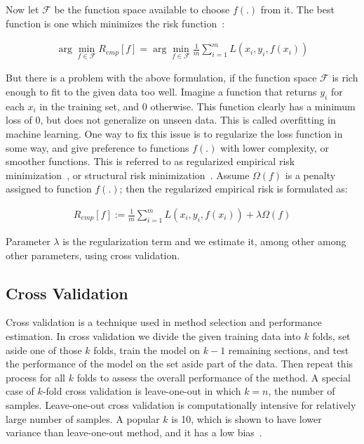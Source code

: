 Now let $\mathcal{F}$ be the function space available to choose $f(.)$ from it. The best function is one which minimizes the risk function~\cite[p. 67]{learning-with-kernels}:

\begin{align}
  \arg \min_{f \in \mathcal{F}} R_{emp}[f] = \arg \min_{f \in \mathcal{F}} \frac{1}{m}\sum_{i = 1}^{m} L(x_i, y_i, f(x_i))
\end{align}

But there is a problem with the above formulation, if the function space $\mathcal{F}$ is rich enough to fit to the given data too well. Imagine a function that returns $y_i$ for each $x_i$ in the training set, and $0$ otherwise. This function clearly has a minimum loss of $0$, but does not generalize on unseen data. This is called overfitting in machine learning. One way to fix this issue is to regularize the loss function in some way, and give preference to functions $f(.)$ with lower complexity, or smoother functions. This is referred to as regularized empirical risk minimization~\cite[Ch. 4.1]{learning-with-kernels}, or structural risk minimization~\cite[Ch. 4.1]{thenatureofstatisticallearningtheory}. Assume $\Omega(f)$ is a penalty assigned to function $f(.)$; then the regularized empirical risk is formulated as:

\begin{align}
  R_{emp}[f] := \frac{1}{m}\sum_{i = 1}^{m} L(x_i, y_i, f(x_i)) + \lambda \Omega(f)
  \label{frm:bkg:emp-regularized}
\end{align}

Parameter $\lambda$ is the regularization term and we estimate it, among other among other parameters, using cross validation.

\subsection{Cross Validation}
\label{chap:cross-validation}

Cross validation is a technique used in method selection and performance estimation. In cross validation we divide the given training data into $k$ folds, set aside one of those $k$ folds, train the model on $k - 1$ remaining sections, and test the performance of the model on the set aside part of the data. Then repeat this process for all $k$ folds to assess the overall performance of the method. A special case of $k$-fold cross validation is leave-one-out in which $k=n$, the number of samples. Leave-one-out cross validation is computationally intensive for relatively large number of samples. A popular $k$ is 10, which is shown to have lower variance than leave-one-out method, and it has a low bias~\cite{statistical-learning}. 

